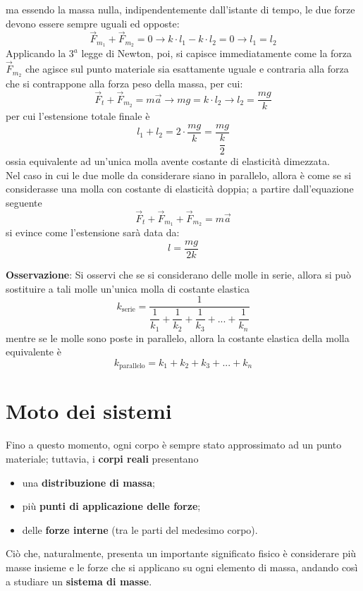\documentclass[a4paper]{extarticle}
\begin{document}
ma essendo la massa nulla, indipendentemente dall'istante di tempo, le due forze devono essere sempre uguali ed opposte:
\[\vec F_{m_1} + \vec F_{m_2} = 0 \longrightarrow k \cdot l_1 - k \cdot l_2 = 0 \longrightarrow l_1 = l_2\]
Applicando la $3^a$ legge di Newton, poi, si capisce immediatamente come la forza $\vec F_{m_2}$ che agisce sul punto materiale sia esattamente uguale e contraria alla forza che si contrappone alla forza peso della massa, per cui:
\[\vec F_t + \vec F_{m_2} = m \vec a \longrightarrow mg = k \cdot l_2 \longrightarrow l_2 = \frac{mg}{k}\]
per cui l'estensione totale finale è
\[l_1 + l_2 = 2 \cdot \dfrac{mg}{k} = \dfrac{mg}{\dfrac{k}{2}}\]
ossia equivalente ad un'unica molla avente costante di elasticità dimezzata.\\
Nel caso in cui le due molle da considerare siano in parallelo, allora è come se si considerasse una molla con costante di elasticità doppia; a partire dall'equazione seguente
\[\vec F_t + \vec F_{m_1} + \vec F_{m_2} = m \vec a\]
si evince come l'estensione sarà data da:
\[l=\frac{mg}{2k}\]

\vspace{1em}
\noindent
\textbf{Osservazione}: Si osservi che se si considerano delle molle in serie, allora si può sostituire a tali molle un'unica molla di costante elastica
\[\boxed{k_{\text{serie}}=\dfrac{1}{\dfrac{1}{k_1}+\dfrac{1}{k_2}+\dfrac{1}{k_3}+...+\dfrac{1}{k_n}}}\]
mentre se le molle sono poste in parallelo, allora la costante elastica della molla equivalente è
\[\boxed{k_{\text{parallelo}}=k_1+k_2+k_3+...+k_n}\]

\newpage
\section{Moto dei sistemi}
Fino a questo momento, ogni corpo è sempre stato approssimato ad un punto materiale; tuttavia, i \textbf{corpi reali} presentano
\begin{itemize}
  \item una \textbf{distribuzione di massa};
  \item più \textbf{punti di applicazione delle forze};
  \item delle \textbf{forze interne} (tra le parti del medesimo corpo).
\end{itemize}
Ciò che, naturalmente, presenta un importante significato fisico è considerare più masse insieme e le forze che si applicano su ogni elemento di massa, andando così a studiare un \textbf{sistema di masse}.
\end{document}
